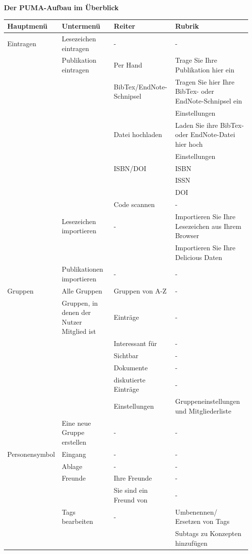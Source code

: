 \textbf{Der PUMA-Aufbau im Überblick}
\begin{longtabu}{|X|X|X|X|}\hline 
\bfseries Hauptmenü&\bfseries Untermenü&Reiter &\bfseries Rubrik\\  \hline
Eintragen&Lesezeichen eintragen &- &-\\ 
&Publikation eintragen &Per Hand& Trage Sie Ihre Publikation hier ein\\
&&BibTex/EndNote-Schnipsel& Tragen Sie hier Ihre BibTex- oder EndNote-Schnipsel ein\\ 
&&& Einstellungen\\ 
&&Datei hochladen& Laden Sie ihre BibTex- oder EndNote-Datei hier hoch\\ 
&&&Einstellungen\\ 
&&ISBN/DOI& ISBN\\ 
&&& ISSN \\ 
&&&DOI\\ 
&&Code scannen&-\\ 
&Lesezeichen importieren&- &Importieren Sie Ihre Lesezeichen aus Ihrem Browser\\ 
&& & Importieren Sie Ihre Delicious Daten\\  
&Publikationen importieren &-&-\\ \hline
Gruppen&Alle Gruppen& Gruppen von A-Z &-\\ 
&Gruppen, in denen der Nutzer Mitglied ist& Einträge &-\\
&&Interessant für &- \\ 
&&Sichtbar&-\\ 
&&Dokumente&-\\ 
&&diskutierte Einträge&-\\ 
&&Einstellungen&Gruppeneinstellungen und Mitgliederliste\\ 
&Eine neue Gruppe erstellen&-&-\\ \hline
Personensymbol&Eingang&-&-\\ 
&Ablage&-&-\\ 
&Freunde&Ihre Freunde&- \\ 
&&Sie sind ein Freund von&- \\ 
&Tags bearbeiten&-&Umbenennen/ Ersetzen von Tags\\ 
&&&Subtags zu Konzepten hinzufügen\\ 

\end{longtabu}
